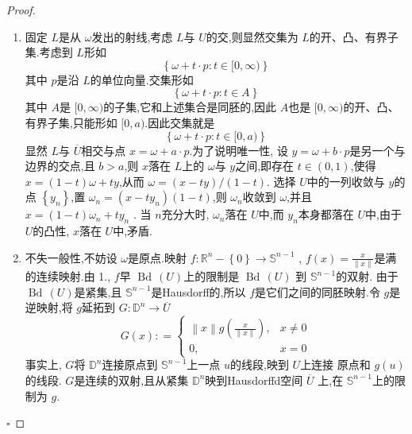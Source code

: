 \documentclass[../../几何与拓扑.tex]{subfiles}
\begin{document}
\begin{proof}

    \begin{enumerate}
        \item 固定 \(  L  \)是从 \(   \omega   \)发出的射线,考虑 \(  L  \)与 \(  U  \)的交,则显然交集为 \(  L  \)的开、凸、有界子集.考虑到 \(  L  \)形如 \[
        \left\{  \omega + t \cdot p: t \in [0,\infty) \right\}
        \]      其中 \(  p  \)是沿 \(  L  \)的单位向量.交集形如 \[
        \left\{  \omega + t\cdot p: t \in A \right\}
        \]其中 \(  A  \)是 \(  [0,\infty)  \)的子集,它和上述集合是同胚的,因此 \(  A  \)也是 \(  [0,\infty)  \)的开、凸、有界子集,只能形如 \(  [0,a)  \).因此交集就是 \[
        \left\{  \omega + t\cdot p: t \in [0,a) \right\}
        \] 显然 \(  L  \)与 \(  \overline{U}  \)相交与点 \(  x =   \omega + a\cdot p  \).为了说明唯一性,
        设 \(  y =   \omega + b\cdot p  \)是另一个与边界的交点,且 \(  b>a  \),则 \(  x  \)落在 \(  L  \)上的 \(   \omega   \)与 \(  y  \)之间,即存在 \(  t \in \left( 0,1 \right)   \),使得
         \(   x =  \left( 1-t \right) \omega + ty   \),从而 \(   \omega  =  \left( x-ty \right)  / \left( 1-t \right)    \).
         选择 \(  U  \)中的一列收敛与 \(  y  \)的点 \(  \left\{ y_{n} \right\}  \),置 \(   \omega _{n} =  \left( x-ty_{n} \right)\left( 1-t \right)    \),则 \(   \omega _{n}  \)收敛到 \(   \omega   \),并且 \(  x =  \left( 1-t \right) \omega _{n}+ ty_{n}   \)                 .
         当 \(  n  \)充分大时, \(   \omega _{n}  \)落在 \(  U  \)中,而 \(  y_{n}  \)本身都落在 \(  U  \)中,由于 \(  U  \)的凸性, \(  x  \)落在 \(  U  \)中,矛盾.   
         
         
         \item 不失一般性,不妨设 \(   \omega   \)是原点.映射 \(  f: \mathbb{R} ^{n}-\left\{ 0 \right\}\to \mathbb{S}^{n-1}  \)  , \(  f\left( x \right) =  \frac{x }{\left\| x \right\| }    \)是满的连续映射.由
         1., \(  f  \)早 \(  \operatorname{Bd}\,\left( U \right)   \)上的限制是 \(  \operatorname{Bd}\,\left( U \right)   \)    到  \(  \mathbb{S}^{n-1}  \)的双射.
         由于 \(  \operatorname{Bd}\,\left( U \right)   \)是紧集,且 \(  \mathbb{S}^{n-1}  \)是Hausdorff的,所以 \(  f  \)是它们之间的同胚映射.令 \(  g  \)是逆映射,将 \(  g  \)延拓到 \(  G: \mathbb{D}^{n} \to \overline{U}  \) \[
         G\left( x \right): =  \begin{cases} \left\| x \right\| g\left( \frac{x }{\left\| x \right\| }  \right) ,& x \neq 0\\ 
           0,& x = 0 \end{cases}  
         \] 事实上, \(  G  \)将 \(  \mathbb{D}^{n}  \)连接原点到 \(  \mathbb{S}^{n-1}  \)上一点 \(  u  \)的线段,映到 \(  U  \)上连接 原点和 \(g\left( u \right)   \)的线段. \(  G  \)是连续的双射,且从紧集 \(  \mathbb{D}^{n}  \)映到Hausdorffd空间 \(  \overline{U}  \)  上,在 \(  \mathbb{S}^{n-1}  \)上的限制为 \(  g  \).           
    \end{enumerate}
    

    \hfill $\square$
\end{proof}
\end{document}

